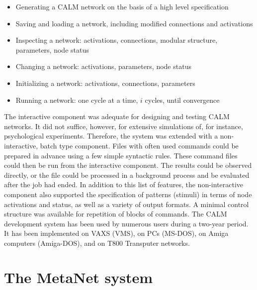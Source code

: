 \documentclass[11pt, a4paper]{article}
\begin{document}
\begin{itemize}
  \item Generating a CALM network on the basis of a high level specification
  \item Saving and loading a network, including modified connections and activations
  \item Inspecting a network: activations, connections, modular structure, parameters, node status
  \item Changing a network: activations, parameters, node status
  \item Initializing a network: activations, connections, parameters
  \item Running a network: one cycle at a time, $i$ cycles, until convergence
\end{itemize}

The interactive component was adequate for designing and testing CALM networks. It did not suffice, however, for extensive simulations of, for instance, psychological experiments. Therefore, the system was extended with a non-interactive, batch type component. Files with often used commands could be prepared in advance using a few simple syntactic rules. These command files could then be run from the interactive component. The results could be observed directly, or the file could be processed in a background process and be evaluated after the job had ended. In addition to this list of features, the non-interactive component also supported the specification of patterns (stimuli) in terms of node activations and status, as well as a variety of output formats. A minimal control structure was available for repetition of blocks of commands. The CALM development system has been used by numerous users during a two-year period. It has been implemented on VAXS (VMS), on PCs (MS-DOS), on Amiga computers (Amiga-DOS), and on T800 Transputer networks.

\section*{\color{navyaccent} The MetaNet system}
\end{document}
